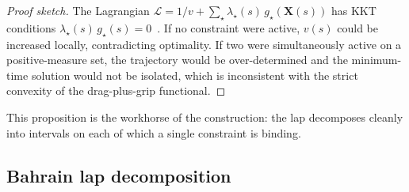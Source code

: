 \documentclass[11pt,twocolumn]{article}
\theoremstyle{definition}
\theoremstyle{remark}
\begin{document}
\begin{proof}[Proof sketch]
The Lagrangian
$\mathcal{L} = 1/v + \sum_\star \lambda_\star(s)\, g_\star(\bm{X}(s))$ has KKT
conditions $\lambda_\star(s)\, g_\star(s) = 0$~\cite{bertsekas2005,bryson1975}. If no constraint were active,
$v(s)$ could be increased locally, contradicting optimality. If two were
simultaneously active on a positive-measure set, the trajectory would be
over-determined and the minimum-time solution would not be isolated, which
is inconsistent with the strict convexity of the drag-plus-grip functional.
\end{proof}

This proposition is the workhorse of the construction: the lap decomposes
cleanly into intervals on each of which a single constraint is binding.

\subsection{Bahrain lap decomposition}
\end{document}
